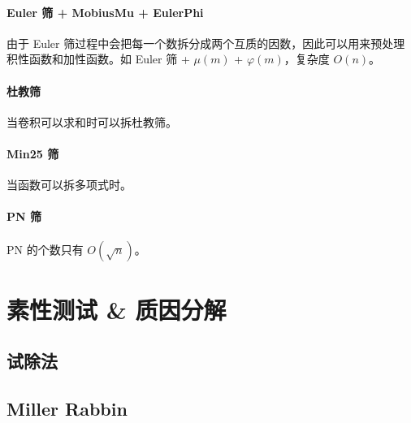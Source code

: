 \documentclass{probook}
\begin{document}
\begin{multicols}{2}


\paragraph{Euler 筛 + MobiusMu + EulerPhi}

由于 Euler 筛过程中会把每一个数拆分成两个互质的因数，因此可以用来预处理积性函数和加性函数。如 Euler 筛 + $\mu(m)$ + $\varphi(m)$，复杂度 $O(n)$。



\paragraph{杜教筛}

当卷积可以求和时可以拆杜教筛。



\paragraph{Min25 筛}

当函数可以拆多项式时。



\paragraph{PN 筛}

PN 的个数只有 $O(\sqrt n)$。



\section{素性测试 \& 质因分解}

\subsection{试除法}



\subsection{Miller Rabbin}


\end{multicols}
\end{document}
